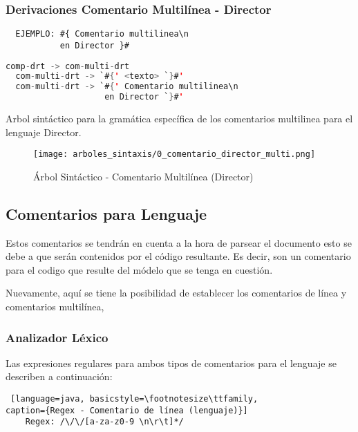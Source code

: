 \subsubsection{Derivaciones Comentario Multilínea - Director}
\begin{lstlisting}
  EJEMPLO: #{ Comentario multilinea\n
           en Director }#
\end{lstlisting}

\begin{lstlisting}[basicstyle=\footnotesize\ttfamily, language=Java,
caption={Derivaciones - Comentario Multilínea (Director)}]
  comp-drt -> com-multi-drt
  com-multi-drt -> `#{' <texto> `}#'
  com-multi-drt -> `#{' Comentario multilinea\n
                    en Director `}#'
\end{lstlisting}

Arbol sintáctico para la gramática específica de los comentarios multilinea para
el lenguaje Director.

\begin{figure}[H]
  \centering
  \texttt{[image: arboles\_sintaxis/0\_comentario\_director\_multi.png]}
  \caption{Árbol Sintáctico - Comentario Multilínea (Director)}
  \label{as:commultilineadrt}
\end{figure}


\subsection{Comentarios para Lenguaje}
\label{sub:comentarioleng}
Estos comentarios se tendrán en cuenta a la hora de parsear el documento esto
se debe a que serán contenidos por el código resultante. Es decir, son un
comentario para el codigo que resulte del módelo que se tenga en cuestión.

Nuevamente, aquí se tiene la posibilidad de establecer los comentarios de línea
y comentarios multilínea,

\subsubsection{Analizador Léxico}
Las expresiones regulares para ambos tipos de comentarios para el lenguaje
se describen a continuación:

\begin{lstlisting} [language=java, basicstyle=\footnotesize\ttfamily,
caption={Regex - Comentario de línea (lenguaje)}]
	Regex: /\/\/[a-za-z0-9 \n\r\t]*/
\end{lstlisting}

